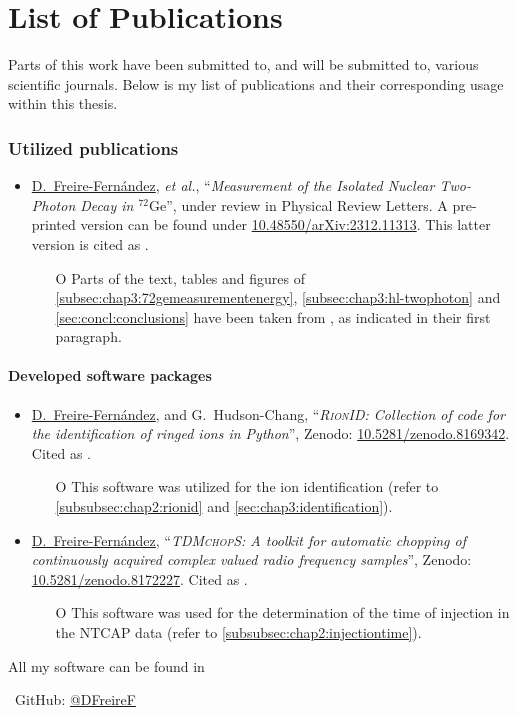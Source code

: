 
\chapter*{List of Publications}
Parts of this work have been submitted to, and will be submitted to, various scientific journals.
Below is my list of publications and their corresponding usage within this thesis.

\subsection*{Utilized publications}
\begin{itemize}
    \item \underline{D.~Freire-Fernández}, \textit{et al.}, ``{\it Measurement of the Isolated Nuclear Two-Photon Decay in $^{72}\mathrm{Ge}$}'', under review in Physical Review Letters. A pre-printed version can be found under \href{https://doi.org/10.48550/arXiv.2312.11313}{10.48550/arXiv:2312.11313}. This latter version is cited as \cite{freirefernández2023measurement}.
    \begin{itemize}
      \item[O] Parts of the text, tables and figures of \cref{subsec:chap3:72gemeasurementenergy}, \cref{subsec:chap3:hl-twophoton} and \cref{sec:concl:conclusions} have been taken from \cite{freirefernández2023measurement}, as indicated in their first paragraph.
    \end{itemize} 
  \end{itemize}
\subsubsection*{Developed software packages}
\begin{itemize}
  \item \underline{D.~Freire-Fernández}, and G.~Hudson-Chang, ``{\it \textsc{RionID}: Collection of code for the identification of ringed ions in Python}'', Zenodo: \href{https://doi.org/10.5281/zenodo.8169342}{10.5281/zenodo.8169342}. Cited as \cite{rionid}.
  \begin{itemize}
    \item[O] This software was utilized for the ion identification (refer to \cref{subsubsec:chap2:rionid} and \cref{sec:chap3:identification}).
  \end{itemize}
  \item \underline{D.~Freire-Fernández}, ``{\it \textsc{TDMchopS}: A toolkit for automatic chopping of continuously acquired complex valued radio frequency samples}'', Zenodo: \href{https://doi.org/10.5281/zenodo.8172227}{10.5281/zenodo.8172227}. Cited as \cite{freire_fernandez_2023_8172227}. 
  \begin{itemize}
    \item[O] This software was used for the determination of the time of injection in the \textsc{NTCAP} data (refer to \cref{subsubsec:chap2:injectiontime}).
  \end{itemize}
\end{itemize}
All my software can be found in {\faGithub\ GitHub: \href{https://github.com/DFreireF}{@DFreireF} \par}
